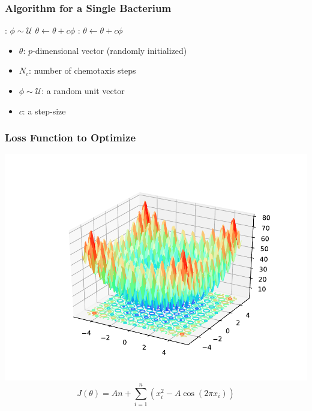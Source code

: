 \documentclass{beamer}
\begin{document}
\begin{frame}
\frametitle{Algorithm for a Single Bacterium}
\begin{algorithmic}[1]
:
  \State $\phi \sim \mathcal{U}$
  \State $\theta \gets \theta + c \phi$
  :
    \State $\theta \gets \theta + c \phi$
  \EndWhile
\EndFor
\end{algorithmic}
\begin{itemize}
  \item $\theta$: $p$-dimensional vector (randomly initialized)
  \item $N_c$: number of chemotaxis steps
  \item $\phi \sim \mathcal{U}$: a random unit vector
  \item $c$: a step-size
\end{itemize}
\end{frame}

\begin{frame}
\frametitle{Loss Function to Optimize}
\begin{center}
\includegraphics[scale=0.5]{assets/rastrigin}
$$J(\theta) = An + \sum_{i=1}^n \left( x_i^2 - A \cos(2 \pi x_i) \right)$$
\end{center}
\end{frame}

\end{document}
